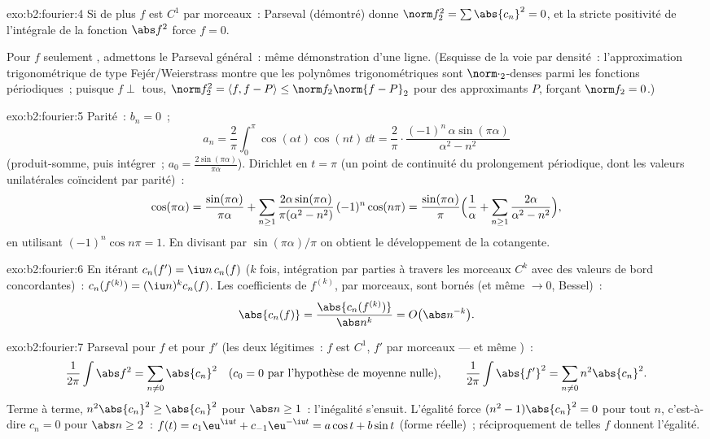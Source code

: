 \begin{solution}{exo:b2:fourier:4}
Si de plus $f$ est $C^1$ par morceaux~: Parseval (démontré) donne
$\norm f_2^2 = \sum\abs{c_n}^2 = 0$, et la stricte positivité de
l'intégrale de la fonction  $\abs f^2$ force $f = 0$.

Pour $f$ seulement , admettons le Parseval général~: même
démonstration d'une ligne. (Esquisse de la voie par densité~:
l'approximation trigonométrique de type Fejér/Weierstrass montre que
les polynômes trigonométriques sont $\norm\cdot_2$-denses parmi les
fonctions  périodiques~; puisque $f \perp$ tous, $\norm
f_2^2 = \langle f, f - P\rangle \leq \norm f_2\norm{f - P}_2$ pour
des approximants $P$, forçant $\norm f_2 = 0$.)
\end{solution}

\begin{solution}{exo:b2:fourier:5}
Parité~: $b_n = 0$~;
\[
a_n = \frac{2}{\pi}\int_0^\pi \cos(\alpha t)\cos(nt)\,\dd t
= \frac{2}{\pi}\cdot
\frac{(-1)^n\,\alpha\sin(\pi\alpha)}{\alpha^2 - n^2}
\]
(produit-somme, puis intégrer~; $a_0 =
\frac{2\sin(\pi\alpha)}{\pi\alpha}$). Dirichlet en $t = \pi$ (un
point de continuité du prolongement périodique, dont les valeurs
unilatérales coïncident par parité)~:
\[
\cos(\pi\alpha)
= \frac{\sin(\pi\alpha)}{\pi\alpha}
+ \sum_{n\geq1} \frac{2\alpha\sin(\pi\alpha)}{\pi(\alpha^2 -
n^2)}\,(-1)^n\cos(n\pi)
= \frac{\sin(\pi\alpha)}{\pi}\Bigl(\frac{1}{\alpha} +
\sum_{n\geq1}\frac{2\alpha}{\alpha^2 - n^2}\Bigr),
\]
en utilisant $(-1)^n\cos n\pi = 1$. En divisant par
$\sin(\pi\alpha)/\pi$ on obtient le développement de la cotangente.
\end{solution}

\begin{solution}{exo:b2:fourier:6}
En itérant $c_n(f') = \iu n\,c_n(f)$ ($k$ fois, intégration par
parties à travers les morceaux $C^{k}$ avec des valeurs de bord
concordantes)~: $c_n(f^{(k)}) = (\iu n)^k c_n(f)$. Les coefficients
de $f^{(k)}$,  par morceaux, sont bornés (et même $\to 0$,
Bessel)~:
\[
\abs{c_n(f)} = \frac{\abs{c_n(f^{(k)})}}{\abs n^k}
= O\bigl(\abs n^{-k}\bigr) .
\]
\end{solution}

\begin{solution}{exo:b2:fourier:7}
Parseval pour $f$ et pour $f'$ (les deux légitimes~: $f$ est $C^1$,
$f'$  par morceaux --- et même )~:
\[
\frac{1}{2\pi}\int \abs f^2 = \sum_{n\neq0} \abs{c_n}^2
\quad (c_0 = 0 \text{ par l'hypothèse de moyenne nulle}),
\qquad
\frac{1}{2\pi}\int \abs{f'}^2 = \sum_{n\neq0} n^2\abs{c_n}^2 .
\]
Terme à terme, $n^2\abs{c_n}^2 \geq \abs{c_n}^2$ pour $\abs n \geq
1$~: l'inégalité s'ensuit. L'égalité force $(n^2 - 1)\abs{c_n}^2 = 0$
pour tout $n$, c'est-à-dire $c_n = 0$ pour $\abs n \geq 2$~: $f(t) =
c_1\eu^{\iu t} + c_{-1}\eu^{-\iu t} = a\cos t + b\sin t$ (forme
réelle)~; réciproquement de telles $f$ donnent l'égalité.
\end{solution}

